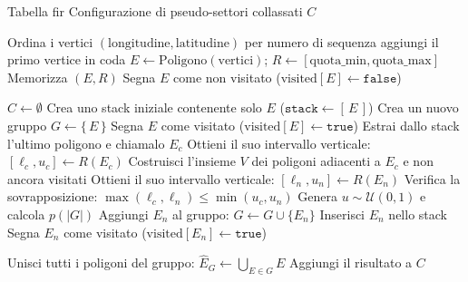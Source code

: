     \begin{algorithm}[H]
      \caption{Generazione configurazione di pseudo-settori collassati.}
      \label{alg:collasso-dfs-prob}
      \begin{algorithmic}[1]
        \Require Tabella \gls{fir}
            \Ensure Configurazione di pseudo-settori collassati \(C\)
    
        \Statex
          \State Ordina i vertici \((\text{longitudine}, \text{latitudine})\) per numero di sequenza
           \State aggiungi il primo vertice in coda  \EndIf
          \State \(E \gets \mathrm{Poligono}(\text{vertici})\); \quad \(R \gets [\text{quota\_min}, \text{quota\_max}]\)
          \State Memorizza \((E, R)\)
          \State Segna \(E\) come non visitato \; ($\text{visited}[E]\gets\texttt{false}$)

        \EndFor
        
        \State $C \gets \emptyset$
            \State Crea uno stack iniziale contenente solo $E$ \; ($\texttt{stack}\gets[\,E\,]$)
            \State Crea un nuovo gruppo \; $G \gets \{\,E\,\}$
            \State Segna $E$ come visitato \; ($\text{visited}[E]\gets\texttt{true}$)
                \State Estrai dallo stack l’ultimo poligono e chiamalo \(E_c\)
                \State Ottieni il suo intervallo verticale: $[\ell_c, u_c] \gets R(E_c)$
                \State Costruisci l’insieme \(V\) dei poligoni adiacenti a \(E_c\) e non ancora visitati
                    \State Ottieni il suo intervallo verticale: $[\ell_n, u_n] \gets R(E_n)$
                    \State Verifica la sovrapposizione: $\max(\ell_c,\ell_n) \le \min(u_c,u_n)$
                        \State Genera $u \sim \mathcal{U}(0,1)$ e calcola $p(|G|)$
                            \State Aggiungi $E_n$ al gruppo: $G \gets G \cup \{E_n\}$
                            \State Inserisci $E_n$ nello stack
                            \State Segna $E_n$ come visitato \; ($\text{visited}[E_n]\gets\texttt{true}$)

                            \EndIf
                    \EndIf
                \EndFor
            \EndWhile
          \State Unisci tutti i poligoni del gruppo: $\widehat{E}_G \gets \bigcup_{E \in G} E$
          \State Aggiungi il risultato a $C$
        \EndFor
        \end{algorithmic}
    \end{algorithm}
    \clearpage
    
